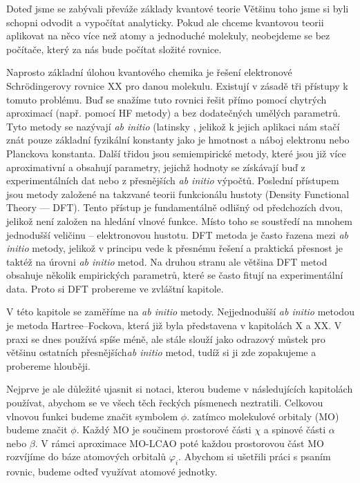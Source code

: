 Doteď jsme se zabývali převáže základy kvantové teorie 
Většinu toho jsme si byli schopni odvodit a vypočítat analyticky. 
Pokud ale chceme kvantovou teorii aplikovat na něco více než atomy a jednoduché molekuly,
neobejdeme se bez počítače, který za nás bude počítat složité rovnice.

Naprosto základní úlohou kvantového chemika je řešení elektronové Schr\"{o}dingerovy rovnice XX pro danou molekulu. Existují v zásadě tři přístupy k tomuto problému. Buď se snažíme tuto rovnici řešit přímo pomocí chytrých aproximací (např. pomocí HF metody) a bez dodatečných umělých parametrů. Tyto metody se nazývají \textit{ab initio} (latinsky , jelikož k jejich aplikaci nám stačí znát pouze základní fyzikální konstanty jako je hmotnost a náboj elektronu nebo Planckova konstanta. Další třidou jsou semiempirické metody, které jsou již více aproximativní a obsahují parametry, jejichž hodnoty se získávají buď z experimentálních dat nebo z přesnějších \textit{ab initio} výpočtů. Poslední přístupem jsou metody založené na takzvané teorii funkcionálu hustoty (Density Functional Theory --- DFT). Tento přístup je fundamentálně odlišný od předchozích dvou, jelikož není založen na hledání vlnové funkce. Místo toho se soustředí na mnohem jednodušší veličinu -- elektronovou hustotu. DFT metoda je často řazena mezi \textit{ab initio} metody, jelikož v principu vede k přesnému řešení a praktická přesnost je taktéž na úrovni \textit{ab initio} metod. Na druhou stranu ale většina DFT metod obsahuje několik empirických parametrů, které se často fitují na experimentální data. Proto si DFT probereme ve zvláštní kapitole.  

V této kapitole se zaměříme na \textit{ab initio} metody.
Nejjednodušší \textit{ab initio} metodou je metoda Hartree--Fockova, která již byla představena v kapitolách X a XX. V praxi se dnes používá spíše méně, ale stále slouží jako odrazový můstek pro většinu ostatních přesnějších\textit{ab initio} metod, tudíž si ji zde zopakujeme a probereme hlouběji.

Nejprve je ale důležité ujasnit si notaci, kterou budeme v následujících kapitolách používat, abychom se ve všech těch řeckých písmenech neztratili. Celkovou vlnovou funkci budeme značit symbolem $\phi$.  zatímco molekulové orbitaly (MO) budeme značit $\phi$. Každý MO je součinem prostorové části $\chi$ a spinové části $\alpha$ nebo $\beta$. V rámci aproximace MO-LCAO poté každou prostorovou část MO rozvíjíme do báze atomových orbitalů $\varphi_i$. Abychom si ušetřili práci s psaním rovnic, budeme odteď využívat atomové jednotky.

